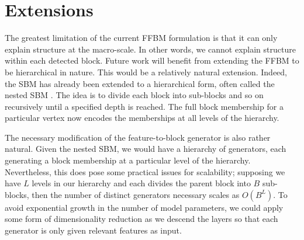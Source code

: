 \section{Extensions}

The greatest limitation of the current FFBM formulation is that it can only explain structure at the macro-scale. In other words, we cannot explain structure within each detected block. Future work will benefit from extending the FFBM to be hierarchical in nature. This would be a relatively natural extension. Indeed, the SBM has already been extended to a hierarchical form, often called the nested SBM \cite{SBM-hierarchical}. The idea is to divide each block into sub-blocks and so on recursively until a specified depth is reached. The full block membership for a particular vertex now encodes the memberships at all levels of the hierarchy.

The necessary modification of the feature-to-block generator is also rather natural. Given the nested SBM, we would have a hierarchy of generators, each generating a block membership at a particular level of the hierarchy. Nevertheless, this does pose some practical issues for scalability; supposing we have $L$ levels in our hierarchy and each divides the parent block into $B$ sub-blocks, then the number of distinct generators necessary scales as $O(B^L)$. To avoid exponential growth in the number of model parameters, we could apply some form of dimensionality reduction as we descend the layers so that each generator is only given relevant features as input.